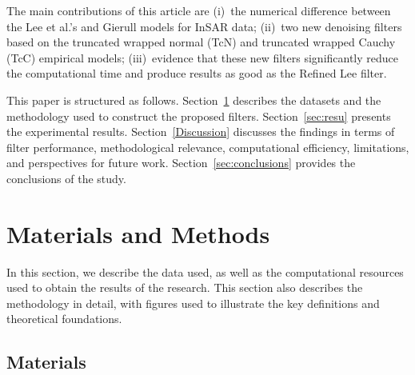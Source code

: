 \documentclass[remotesensing,article,submit,pdftex,moreauthors]{Definitions/mdpi}
\begin{document}

The main contributions of this article are 
(i)~the numerical 	difference between the Lee et al.'s and Gierull models for InSAR data; 
(ii)~two new denoising filters based on the truncated wrapped normal (TcN) and truncated wrapped Cauchy (TcC) empirical models; 
(iii)~evidence that these new filters significantly reduce the computational time and  produce results as good as the Refined Lee filter. 



This paper is structured as follows.
Section~\ref{sec:mat_meth} describes the datasets and the methodology used to construct the proposed filters.
Section~\ref{sec:resu} presents the experimental results.
Section~\ref{Discussion} discusses the findings in terms of filter performance, methodological relevance, computational efficiency, limitations, and perspectives for future work.
Section~\ref{sec:conclusions} provides the conclusions of the study.

\section{Materials and Methods}\label{sec:mat_meth}

In this section, we describe the data used, as well as the computational resources used to obtain the results of the research. 
This section also describes the methodology in detail, with figures used to illustrate the key definitions and theoretical foundations.

\subsection{Materials}\label{subsec:materials}
\end{document}
